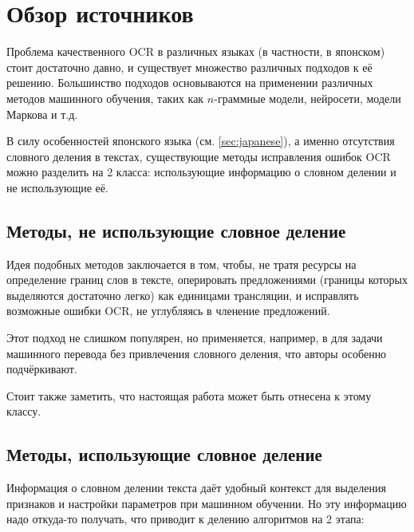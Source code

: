\section{ Обзор источников }\label{sec:litreview}

Проблема качественного OCR в различных языках (в частности, в японском) стоит достаточно давно, и существует множество различных подходов к её решению. Большинство подходов основываются на применении различных методов машинного обучения, таких как $n$-граммные модели, нейросети, модели Маркова и т.д. 

В силу особенностей японского языка (см. \cref{sec:japanese}), а именно отсутствия словного деления в текстах, существующие методы исправления ошибок OCR можно разделить на 2 класса: использующие информацию о словном делении и не использующие её.

\subsection{ Методы, не использующие словное деление }

Идея подобных методов заключается в том, чтобы, не тратя ресурсы на определение границ слов в тексте, оперировать предложениями (границы которых выделяются достаточно легко) как единицами трансляции, и исправлять возможные ошибки OCR, не углубляясь в членение предложений.

Этот подход не слишком популярен, но применяется, например, в \cite{last} для задачи машинного перевода без привлечения словного деления, что авторы особенно подчёркивают.

Стоит также заметить, что настоящая работа может быть отнесена к этому классу.

\subsection{ Методы, использующие словное деление }

Информация о словном делении текста даёт удобный контекст для выделения признаков и настройки параметров при машинном обучении. Но эту информацию надо откуда-то получать, что приводит к делению алгоритмов на 2 этапа:

